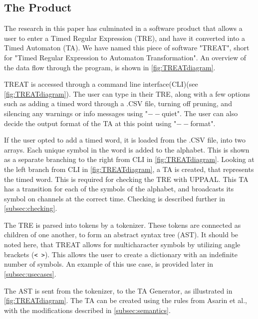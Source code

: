 \subsection{The Product}\label{subsec:theProduct}
The research in this paper has culminated in a software product that allows a user to enter a Timed Regular Expression (TRE), and have it converted into a Timed Automaton (TA).
We have named this piece of software "TREAT", short for "Timed Regular Expression to Automaton Transformation".
An overview of the data flow through the program, is shown in \cref{fig:TREATdiagram}.

\begin{center}
    
\end{center}

TREAT is accessed through a command line interface(CLI)(see \cref{fig:TREATdiagram}). The user can type in their TRE, along with a few options such as adding a timed word through a .CSV file, turning off pruning, and silencing any warnings or info messages using "$--$quiet".
The user can also decide the output format of the TA at this point using "$--$format".

\vspace{.5\baselineskip plus 2pt}
If the user opted to add a timed word, it is loaded from the .CSV file, into two arrays. Each unique symbol in the word is added to the alphabet. This is shown as a separate branching to the right from CLI in \cref{fig:TREATdiagram}.
Looking at the left branch from CLI in \cref{fig:TREATdiagram}, a TA is created, that represents the timed word. This is required for checking the TRE with UPPAAL. This TA has a transition for each of the symbols of the alphabet, and broadcasts its symbol on channels at the correct time. Checking is described further in \cref{subsec:checking}.

\vspace{.5\baselineskip plus 2pt}
The TRE is parsed into tokens by a tokenizer. These tokens are connected as children of one another, to form an abstract syntax tree (AST).
It should be noted here, that TREAT allows for multicharacter symbols by utilizing angle brackets (\verb|< >|). This allows the user to create a dictionary with an indefinite number of symbols. An example of this use case, is provided later in \cref{subsec:usecases}.

\vspace{.5\baselineskip plus 2pt}
The AST is sent from the tokenizer, to the TA Generator, as illustrated in \cref{fig:TREATdiagram}. The TA can be created using the rules from Asarin et al., with the modifications described in \cref{subsec:semantics}.

